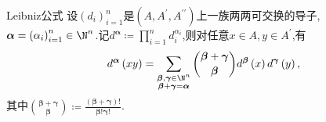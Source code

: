 \begin{corollary}{Leibniz公式}{}
	设$\left(d_{i}\right)_{i=1}^{n}$是$\left(A,A^{\prime},A^{\prime\prime}\right)$上一族两两可交换的导子,$\boldsymbol{\alpha}=\left(\alpha_{i}\right)_{i=1}^{n}\in\N^{n}$.记$d^{\boldsymbol{\alpha}}\coloneq\prod\limits_{i=1}^{n}d_{i}^{\alpha_{i}}$,则对任意$x\in A,y\in A^{\prime}$,有
	\begin{align*}
		d^{\boldsymbol{\alpha}}\left(xy\right)=\sum\limits_{\substack{\boldsymbol{\beta},\boldsymbol{\gamma}\in\N^{n}\\ \boldsymbol{\beta}+\boldsymbol{\gamma}=\boldsymbol{\alpha}}}\binom{\boldsymbol{\beta}+\boldsymbol{\gamma}}{\boldsymbol{\beta}}d^{\boldsymbol{\beta}}\left(x\right)d^{\boldsymbol{\gamma}}\left(y\right),
	\end{align*}
	其中$\binom{\boldsymbol{\beta}+\boldsymbol{\gamma}}{\boldsymbol{\beta}}\coloneq\frac{\left(\boldsymbol{\beta}+\boldsymbol{\gamma}\right)!}{\boldsymbol{\beta}!\boldsymbol{\gamma}!}$.
\end{corollary}

































































